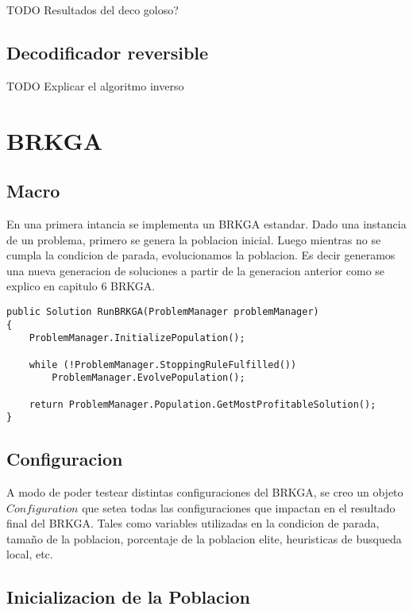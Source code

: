 \bigskip

TODO Resultados del deco goloso?

\subsection{Decodificador reversible}

TODO Explicar el algoritmo inverso

\section{BRKGA}

\subsection{Macro}

En una primera intancia se implementa un BRKGA estandar. Dado una instancia de un problema, primero se genera la poblacion inicial. Luego mientras no se cumpla la condicion de parada, evolucionamos la poblacion. Es decir generamos una nueva generacion de soluciones a partir de la generacion anterior como se explico en capitulo 6 BRKGA.

\begin{lstlisting}
public Solution RunBRKGA(ProblemManager problemManager)
{
    ProblemManager.InitializePopulation();

    while (!ProblemManager.StoppingRuleFulfilled())
        ProblemManager.EvolvePopulation();

    return ProblemManager.Population.GetMostProfitableSolution();
}
\end{lstlisting}


\subsection{Configuracion}

A modo de poder testear distintas configuraciones del BRKGA, se creo un objeto $Configuration$ que setea todas las configuraciones que impactan en el resultado final del BRKGA. Tales como variables utilizadas en la condicion de parada, tamaño de la poblacion, porcentaje de la poblacion elite, heuristicas de busqueda local, etc.

\subsection{Inicializacion de la Poblacion}

